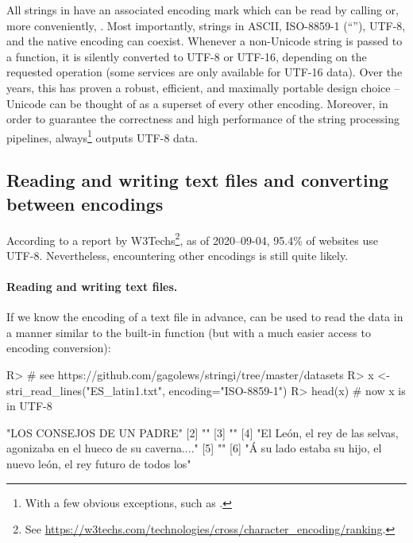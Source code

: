 \documentclass[nojss]{jss}
\begin{document}
All strings in  have an associated encoding mark
which can be read by calling  or, more conveniently,
.
Most importantly, strings in ASCII, ISO-8859-1 (``''),
UTF-8, and the native encoding can coexist.
Whenever a non-Unicode string is passed to a  function,
it is silently converted to UTF-8 or UTF-16, depending on the requested
operation (some  services are only available for {UTF-16} data).
Over the years, this has proven a robust, efficient, and maximally portable
design choice -- Unicode can be thought of as a superset of every other encoding.
Moreover, in order to guarantee the correctness and high performance of
the string processing pipelines,  always\footnote{With a few
obvious exceptions, such as .} outputs
UTF-8 data.


\subsection{Reading and writing text files and converting between encodings}\label{Sec:read_lines}

According to a report by W3Techs\footnote{See
\url{https://w3techs.com/technologies/cross/character_encoding/ranking}.},
as of 2020--09-04, 95.4\% of websites use UTF-8.
Nevertheless, encountering other encodings is still quite likely.

\paragraph{Reading and writing text files.}
If we know the encoding of a text file  in advance,
 can be used to read
the data in a manner similar to the built-in  function
(but with a much easier access to encoding conversion):

\begin{Schunk}
\begin{Sinput}
R> # see https://github.com/gagolews/stringi/tree/master/datasets
R> x <- stri_read_lines("ES_latin1.txt", encoding="ISO-8859-1")
R> head(x)  # now x is in UTF-8
\end{Sinput}
\begin{Soutput}
[1] "LOS CONSEJOS DE UN PADRE"
[2] ""
[3] ""
[4] "El León, el rey de las selvas, agonizaba en el hueco de su caverna...."
[5] ""
[6] "Á su lado estaba su hijo, el nuevo león, el rey futuro de todos los"
\end{Soutput}
\end{Schunk}
\end{document}
